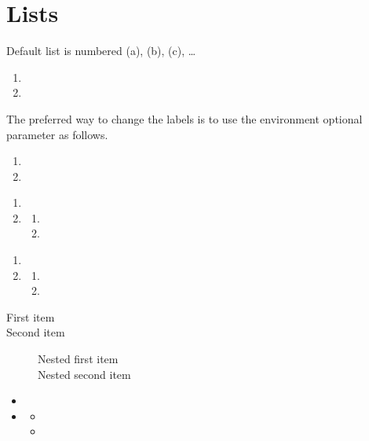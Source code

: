 \documentclass[solutionsatend,twocolumnsolutions]{ouunit}
\newenvironment{highlight}[1][]{\begin{style2box}[#1]}{\end{style2box}}
\begin{document}
\section{Lists}
Default list is numbered (a), (b), (c), \ldots
\begin{enumerate}
\item
\lipsum[133]
\item
\lipsum[133]
\end{enumerate}
The preferred way to change the labels is to use the environment optional parameter as follows.
\begin{enumerate}[1.]
\item
\lipsum[133]
\item
\lipsum[133]
\end{enumerate}
\lipsum[133]
\begin{enumerate}
\item
\lipsum[133]
\item
\lipsum[133]
\begin{enumerate}
\item
\lipsum[133]
\item
\lipsum[133]
\end{enumerate}
\end{enumerate}
\begin{highlight}
\lipsum[133]
\begin{enumerate}
\item
\lipsum[133]
\item
\lipsum[133]
\begin{enumerate}
\item
\lipsum[133]
\item
\lipsum[133]
\end{enumerate}
\end{enumerate}
\end{highlight}
\lipsum[133]
\begin{description}
\item[First item]
\lipsum[133]
\item[Second item]
\lipsum[133]
\begin{description}
\item[Nested first item]
\lipsum[133]
\item[Nested second item]
\lipsum[133]
\end{description}
\end{description}
\lipsum[133]
\begin{itemize}
\item
\lipsum[133]
\item
\lipsum[133]
\begin{itemize}
\item
\lipsum[133]
\item
\lipsum[133]
\end{itemize}
\end{itemize}
\lipsum[133]
\end{document}
